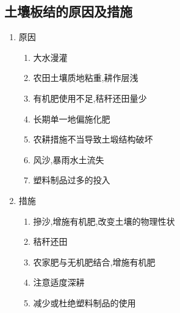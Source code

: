 \documentclass[a4paper]{article}
\begin{document}
    \subsection{土壤板结的原因及措施}
    \begin{enumerate}
        \item 原因
        \begin{enumerate}
            \item 大水漫灌
            \item 农田土壤质地粘重,耕作层浅
            \item 有机肥使用不足,秸秆还田量少
            \item 长期单一地偏施化肥
            \item 农耕措施不当导致土塅结构破坏
            \item 风沙,暴雨水土流失
            \item 塑料制品过多的投入
        \end{enumerate}
        \item 措施
        \begin{enumerate}
            \item 摻沙,增施有机肥,改变土壤的物理性状
            \item 秸秆还田
            \item 农家肥与无机肥结合,增施有机肥
            \item 注意适度深耕
            \item 减少或杜绝塑料制品的使用
        \end{enumerate}
    \end{enumerate}
\end{document}
